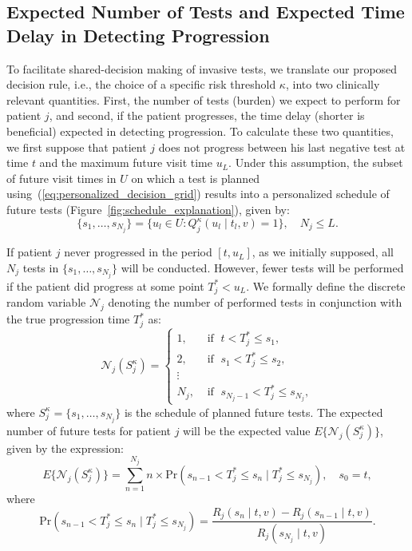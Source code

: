 \subsection{Expected Number of Tests and Expected Time Delay in Detecting Progression}
\label{subsec:exp_delay_estimation}
To facilitate shared-decision making of invasive tests, we translate our proposed decision rule, i.e., the choice of a specific risk threshold $\kappa$, into two clinically relevant quantities. First, the number of tests (burden) we expect to perform for patient $j$, and second, if the patient progresses, the time delay (shorter is beneficial) expected in detecting progression. To calculate these two quantities, we first suppose that patient $j$ does not progress between his last negative test at time $t$ and the maximum future visit time $u_L$. Under this assumption, the subset of future visit times in $U$ on which a test is planned using~(\ref{eq:personalized_decision_grid}) results into a personalized schedule of future tests (Figure~\ref{fig:schedule_explanation}), given by:
\begin{equation}
\label{eq:personalized_schedule_grid}
\{s_1, \ldots, s_{N_j}\} = \big\{ u_l \in U : Q_j^\kappa(u_l \mid t_l, v) = 1 \big\}, \quad N_j \leq L.
\end{equation}

If patient $j$ never progressed in the period $[t, u_L]$, as we initially supposed, all $N_j$ tests in $\{s_1, \ldots, s_{N_j}\}$ will be conducted. However, fewer tests will be performed if the patient did progress at some point $T_j^* < u_L$. We formally define the discrete random variable $\mathcal{N}_j$ denoting the number of performed tests in conjunction with the true progression time $T_j^*$ as:
\[
\mathcal{N}_j (S^\kappa_j) = \left \{
\begin{array}{ll}
1, & \mbox{ if } \; t < T^*_j \leq s_1,\\
2, & \mbox{ if } \; s_1 < T^*_j \leq s_2,\\
\vdots&\\
N_j, & \mbox{ if } \; s_{N_j-1} < T^*_j \leq s_{N_j},
\end{array}
\right.
\]
where $S^\kappa_j = \{s_1, \ldots, s_{N_j}\}$ is the schedule of planned future tests. The expected number of future tests for patient $j$ will be the expected value $E \big \{\mathcal N_j(S^\kappa_j)\big\}$, given by the expression:
\begin{equation*}
\label{eq:exp_tests}
E \big \{\mathcal N_j(S^\kappa_j)\big\} = \sum_{n = 1}^{N_j} n \times \mbox{Pr}(s_{n-1} < T^*_j \leq s_n \mid T^*_j \leq s_{N_j}), \quad s_0 = t,
\end{equation*}
where 
\begin{equation*}
\mbox{Pr}(s_{n-1} < T^*_j \leq s_n \mid T^*_j \leq s_{N_j}) = \frac{R_j(s_n \mid t, v) - R_j(s_{n-1} \mid t, v)}{R_j(s_{N_j} \mid t, v)}.
\end{equation*}

